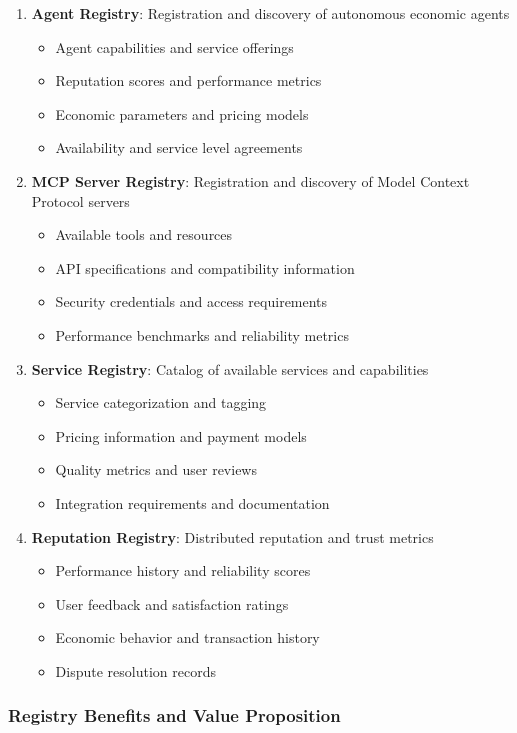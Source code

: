 \documentclass[12pt,a4paper]{article}
\begin{document}
\begin{enumerate}
\item \textbf{Agent Registry}: Registration and discovery of autonomous economic agents
\begin{itemize}
\item Agent capabilities and service offerings
\item Reputation scores and performance metrics
\item Economic parameters and pricing models
\item Availability and service level agreements
\end{itemize}

\item \textbf{MCP Server Registry}: Registration and discovery of Model Context Protocol servers
\begin{itemize}
\item Available tools and resources
\item API specifications and compatibility information
\item Security credentials and access requirements
\item Performance benchmarks and reliability metrics
\end{itemize}

\item \textbf{Service Registry}: Catalog of available services and capabilities
\begin{itemize}
\item Service categorization and tagging
\item Pricing information and payment models
\item Quality metrics and user reviews
\item Integration requirements and documentation
\end{itemize}

\item \textbf{Reputation Registry}: Distributed reputation and trust metrics
\begin{itemize}
\item Performance history and reliability scores
\item User feedback and satisfaction ratings
\item Economic behavior and transaction history
\item Dispute resolution records
\end{itemize}
\end{enumerate}

\subsubsection{Registry Benefits and Value Proposition}
\end{document}
